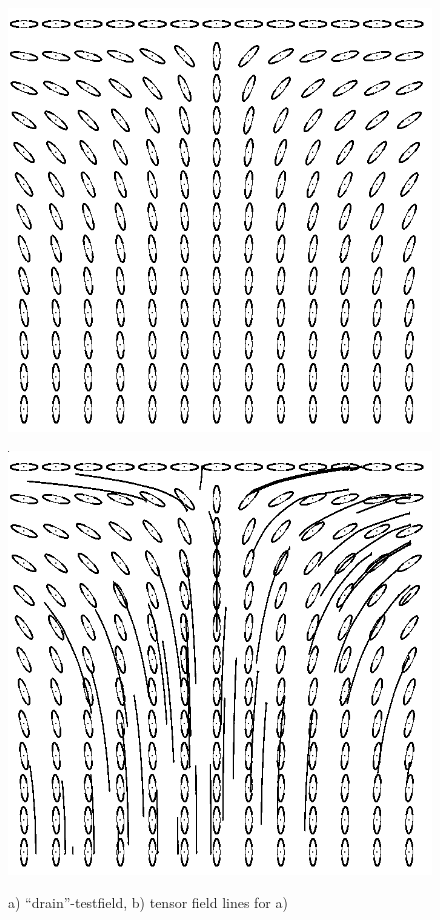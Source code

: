 \documentclass{scrartcl}
\begin{document}
\begin{figure}[!t]
\centering
  \begin{minipage}{0.4\textwidth}
    \includegraphics[width=\textwidth]{img/drain(alt).png}
    \label{a)}
  \end{minipage}
  \begin{minipage}{0.4\textwidth}
    \includegraphics[width=\textwidth]{img/drain(alt)-TFL.png}
    \label{b)}
  \end{minipage}
\caption{a) ``drain''-testfield, b) tensor field lines for a)}
\label{drain}
\end{figure}
\end{document}
